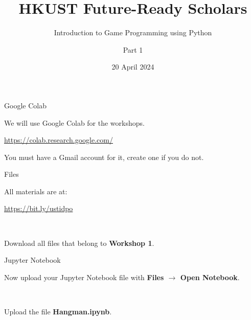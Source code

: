 \documentclass[dvipsnames, svgnames, x11names, handout]{beamer}
\title[HKUST Future-Ready Scholars]{HKUST Future-Ready Scholars}
\subtitle{Introduction to Game Programming using Python}
\author[Game Programming using Python]{Part 1}
\date[April 2024]{20 April 2024}
\begin{document}

\frame{\titlepage}

\begin{frame}[fragile]{Google Colab}
    \begin{center}
        We will use Google Colab for the workshops.

        \href{https://colab.research.google.com/}{https://colab.research.google.com/}

        You must have a Gmail account for it, create one if you do not.
    \end{center}
\end{frame}

\begin{frame}[fragile]{Files}
    \begin{center}
        All materials are at:

        \href{https://bit.ly/ustidpo}{https://bit.ly/ustidpo}

        \


        Download all files that belong to \textbf{Workshop 1}.
    \end{center}
\end{frame}

\begin{frame}[fragile]{Jupyter Notebook}
    \begin{center}
        Now upload your Jupyter Notebook file with \textbf{Files $\rightarrow$ Open Notebook}.
    
        \


        Upload the file \textbf{Hangman.ipynb}.
    
    \end{center}
\end{frame}
\end{document}
